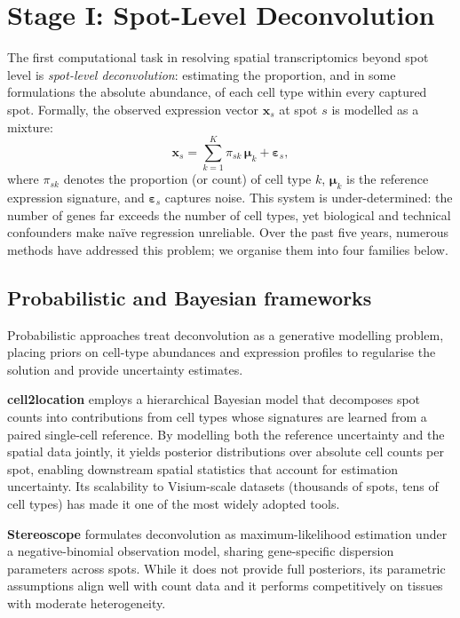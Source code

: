 \section{Stage I: Spot-Level Deconvolution}
\label{sec:stage1}

The first computational task in resolving spatial transcriptomics beyond spot level is \emph{spot-level deconvolution}: estimating the proportion, and in some formulations the absolute abundance, of each cell type within every captured spot. Formally, the observed expression vector $\mathbf{x}_s$ at spot $s$ is modelled as a mixture:
\begin{equation}
  \mathbf{x}_s = \sum_{k=1}^{K} \pi_{sk}\,\boldsymbol{\mu}_k + \boldsymbol{\varepsilon}_s,
  \label{eq:deconv}
\end{equation}
where $\pi_{sk}$ denotes the proportion (or count) of cell type $k$, $\boldsymbol{\mu}_k$ is the reference expression signature, and $\boldsymbol{\varepsilon}_s$ captures noise. This system is under-determined: the number of genes far exceeds the number of cell types, yet biological and technical confounders make na\"ive regression unreliable. Over the past five years, numerous methods have addressed this problem; we organise them into four families below.

\subsection{Probabilistic and Bayesian frameworks}

Probabilistic approaches treat deconvolution as a generative modelling problem, placing priors on cell-type abundances and expression profiles to regularise the solution and provide uncertainty estimates.

\textbf{cell2location} \citep{kleshchevnikov2022cell2location} employs a hierarchical Bayesian model that decomposes spot counts into contributions from cell types whose signatures are learned from a paired single-cell reference. By modelling both the reference uncertainty and the spatial data jointly, it yields posterior distributions over absolute cell counts per spot, enabling downstream spatial statistics that account for estimation uncertainty. Its scalability to Visium-scale datasets (thousands of spots, tens of cell types) has made it one of the most widely adopted tools.

\textbf{Stereoscope} \citep{andersson2020single} formulates deconvolution as maximum-likelihood estimation under a negative-binomial observation model, sharing gene-specific dispersion parameters across spots. While it does not provide full posteriors, its parametric assumptions align well with count data and it performs competitively on tissues with moderate heterogeneity.

